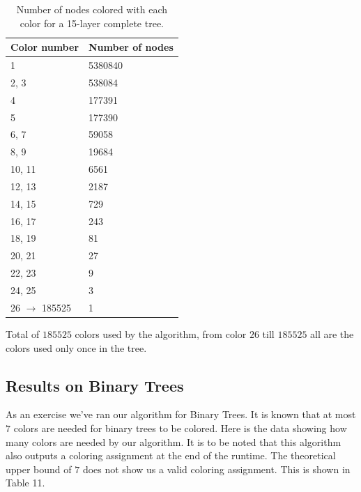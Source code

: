 \documentclass{article}
\theoremstyle{remark}
\begin{document}
\begin{table}[h]
    \centering
    \begin{tabular}{|l|l|}
        \hline
        \textbf{Color number} & \textbf{Number of nodes} \\ \hline
        1                      & 5380840                   \\ \hline
        2, 3                      & 538084                    \\ \hline
        4                      & 177391                    \\ \hline
        5                      & 177390                    \\ \hline
        6, 7                   & 59058                     \\ \hline
        8, 9                   & 19684                     \\ \hline
        10, 11                 & 6561                      \\ \hline
        12, 13                 & 2187                      \\ \hline
        14, 15                 & 729                       \\ \hline
        16, 17                 & 243                       \\ \hline
        18, 19                 & 81                        \\ \hline
        20, 21                 & 27                        \\ \hline
        22, 23                 & 9                         \\ \hline
        24, 25                 & 3                         \\ \hline
        26 $\to$ 185525  & 1\\ \hline
    \end{tabular}
    \caption{Number of nodes colored with each color for a 15-layer complete tree.}
    \label{tab:colors}
\end{table}


Total of $185525$ colors used by the algorithm, from color $26$ till $185525$ all are the colors used only once in the tree.

\subsection{Results on Binary Trees}
As an exercise we've ran our algorithm for Binary Trees. It is known that at most $7$ colors are needed for binary trees to be colored. Here is the data showing how many colors are needed by our algorithm. It is to be noted that this algorithm also outputs a coloring assignment at the end of the runtime. The theoretical upper bound of $7$ does not show us a valid coloring assignment. This is shown in Table 11.
\end{document}
